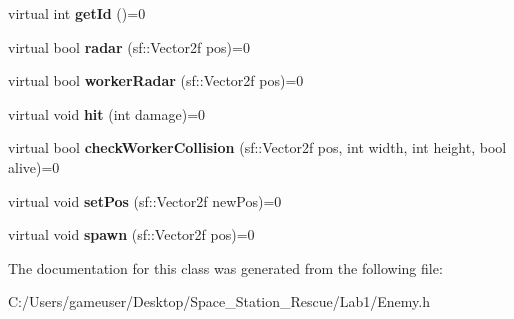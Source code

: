 \begin{DoxyCompactItemize}
virtual int {\bfseries get\+Id} ()=0
\item 
\mbox{\label{class_enemy_a47aae323eab4cf49295135621d05a7ba}} 
virtual bool {\bfseries radar} (sf\+::\+Vector2f pos)=0
\item 
\mbox{\label{class_enemy_afabfa3dbd2b733f7f1f34708bdca6831}} 
virtual bool {\bfseries worker\+Radar} (sf\+::\+Vector2f pos)=0
\item 
\mbox{\label{class_enemy_ab1bd68ec866b706ae427098b19f270f4}} 
virtual void {\bfseries hit} (int damage)=0
\item 
\mbox{\label{class_enemy_adf9b6566c55e2387cbf7fa6390ae5047}} 
virtual bool {\bfseries check\+Worker\+Collision} (sf\+::\+Vector2f pos, int width, int height, bool alive)=0
\item 
\mbox{\label{class_enemy_a115745cf49f3f0c499317af659f354f4}} 
virtual void {\bfseries set\+Pos} (sf\+::\+Vector2f new\+Pos)=0
\item 
\mbox{\label{class_enemy_a8a3c44e3d8eeaf0c032c7a78329119f8}} 
virtual void {\bfseries spawn} (sf\+::\+Vector2f pos)=0
\end{DoxyCompactItemize}


The documentation for this class was generated from the following file\+:\begin{DoxyCompactItemize}
\item 
C\+:/\+Users/gameuser/\+Desktop/\+Space\+\_\+\+Station\+\_\+\+Rescue/\+Lab1/Enemy.\+h\end{DoxyCompactItemize}
